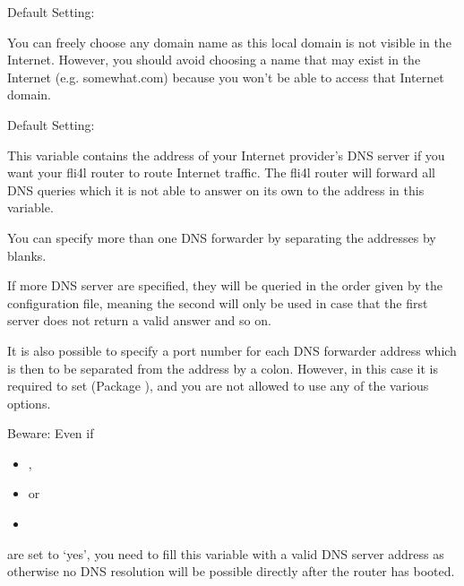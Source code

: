   \begin{description}

    
    Default Setting: 

    {You can freely choose any domain name as this local domain is not visible 
      in the Internet. However, you should avoid choosing a name that may exist in
      the Internet (e.g. somewhat.com) because you won't be able to access
      that Internet domain.}



    Default Setting: 
    
    {This variable contains the address of your Internet provider's DNS server
      if you want your fli4l router to route Internet traffic. The fli4l router
      will forward all DNS queries which it is not able to answer on its own to the
      address in this variable.

      You can specify more than one DNS forwarder by separating the addresses
      by blanks.

      If more DNS server are specified, they will be queried in the order given
      by the configuration file, meaning the second will only be used in case
      that the first server does not return a valid answer and so on.

      It is also possible to specify a port number for each DNS forwarder
      address which is then to be separated from the address by a colon.
      However, in this case it is required to set 
      (Package ), and you are not allowed to use
      any of the various  options.

      Beware: Even if
        \begin{itemize}
        \item {},
        \item {}
          or
        \item {}
        \end{itemize}

        are set to `yes', you need to fill this variable with a valid DNS
        server address as otherwise no DNS resolution will be possible directly
        after the router has booted.

}
\end{description}
